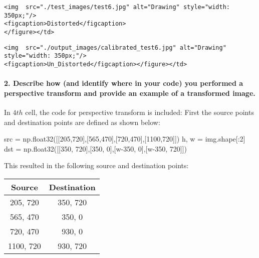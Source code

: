 \documentclass[11pt]{article}
\newenvironment{Shaded}{}{}
\newcommand{\DecValTok}[1]{\textcolor[rgb]{0.25,0.63,0.44}{{#1}}}
\newcommand{\NormalTok}[1]{{#1}}
\newcommand{\OperatorTok}[1]{\textcolor[rgb]{0.40,0.40,0.40}{{#1}}}
\begin{document}
\begin{verbatim}
<img  src="./test_images/test6.jpg" alt="Drawing" style="width: 350px;"/>
<figcaption>Distorted</figcaption>
</figure></td>
\end{verbatim}

\begin{verbatim}
<img  src="./output_images/calibrated_test6.jpg" alt="Drawing" style="width: 350px;"/>
<figcaption>Un_Distorted</figcaption></figure></td>
\end{verbatim}

\paragraph{2. Describe how (and identify where in your code) you
performed a perspective transform and provide an example of a
transformed
image.}\label{describe-how-and-identify-where-in-your-code-you-performed-a-perspective-transform-and-provide-an-example-of-a-transformed-image.}

In \(4th\) cell, the code for perspective transform is included: First
the source points and destination points are defined as shown below:

\begin{Shaded}
\begin{Highlighting}[]
\NormalTok{src }\OperatorTok{=}\NormalTok{ np.float32([[}\DecValTok{205}\NormalTok{,}\DecValTok{720}\NormalTok{],[}\DecValTok{565}\NormalTok{,}\DecValTok{470}\NormalTok{],[}\DecValTok{720}\NormalTok{,}\DecValTok{470}\NormalTok{],[}\DecValTok{1100}\NormalTok{,}\DecValTok{720}\NormalTok{]])}
\NormalTok{h, w }\OperatorTok{=}\NormalTok{ img.shape[:}\DecValTok{2}\NormalTok{]}
\NormalTok{dst }\OperatorTok{=}\NormalTok{ np.float32([[}\DecValTok{350}\NormalTok{, }\DecValTok{720}\NormalTok{],[}\DecValTok{350}\NormalTok{, }\DecValTok{0}\NormalTok{],[w}\OperatorTok{-}\DecValTok{350}\NormalTok{, }\DecValTok{0}\NormalTok{],[w}\OperatorTok{-}\DecValTok{350}\NormalTok{, }\DecValTok{720}\NormalTok{]])}
\end{Highlighting}
\end{Shaded}

This resulted in the following source and destination points:

\begin{longtable}[]{@{}cc@{}}
\toprule
Source & Destination\tabularnewline
\midrule
\endhead
205, 720 & 350, 720\tabularnewline
565, 470 & 350, 0\tabularnewline
720, 470 & 930, 0\tabularnewline
1100, 720 & 930, 720\tabularnewline
\bottomrule
\end{longtable}
\end{document}
